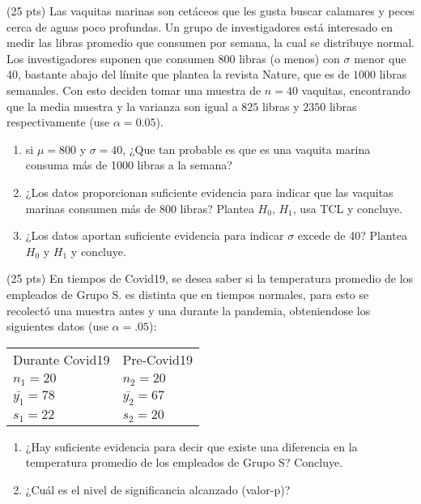 \documentclass[addpoints]{exam}
\theoremstyle{mytheor}
\begin{document}
  
  \begin{questions} 
  \question (25 pts) Las vaquitas marinas son cetáceos que les gusta buscar calamares y peces cerca de aguas poco profundas. Un grupo de investigadores está interesado en medir las libras promedio que consumen por semana, la cual se distribuye normal. Los investigadores suponen que consumen $800$ libras (o menos) con $\sigma$ menor que 40, bastante abajo del límite que plantea la revista Nature, que es de $1000$ libras semanales. Con esto deciden tomar una muestra de $n = 40$ vaquitas, encontrando que la media muestra y la varianza son igual a $825$ libras y $2350$ libras respectivamente (use $\alpha = 0.05$).
  
  \begin{enumerate}
  \item  si $\mu = 800$ y $\sigma = 40$, ¿Que tan probable es que es una vaquita marina consuma más de 1000 libras a la semana?
  \item ¿Los datos proporcionan suficiente evidencia para indicar que las vaquitas marinas consumen más de 800 libras? Plantea $H_0$, $H_1$, usa TCL y concluye.
  \item ¿Los datos aportan suficiente evidencia para indicar $\sigma$ excede de 40? Plantea $H_0$ y $H_1$ y concluye.
  \end{enumerate}
  
  \question (25 pts) En tiempos de Covid19, se desea saber si la temperatura promedio de los empleados de Grupo S. es distinta que en tiempos normales, para esto se recolectó una muestra antes y una durante la pandemia, obteniendose los siguientes datos (use $\alpha = .05$):

    \begin{table}[h]
    \centering
    \begin{tabular}{ll}
    Durante Covid19 & Pre-Covid19 \\
    $n_1 = 20$ & $n_2 = 20$ \\
    $\bar{y_1} =  78$ & $\bar{y_2} = 67$ \\
    $s_1 = 22$ &  $s_2 = 20$
    \end{tabular}
    \end{table}

  \begin{enumerate}
  \item  ¿Hay suficiente evidencia para decir que existe una diferencia en la temperatura promedio de los empleados de Grupo S? Concluye.
  \item ¿Cuál es el nivel de significancia alcanzado (valor-p)?
  \end{enumerate}
  

\end{questions}
\end{document}
